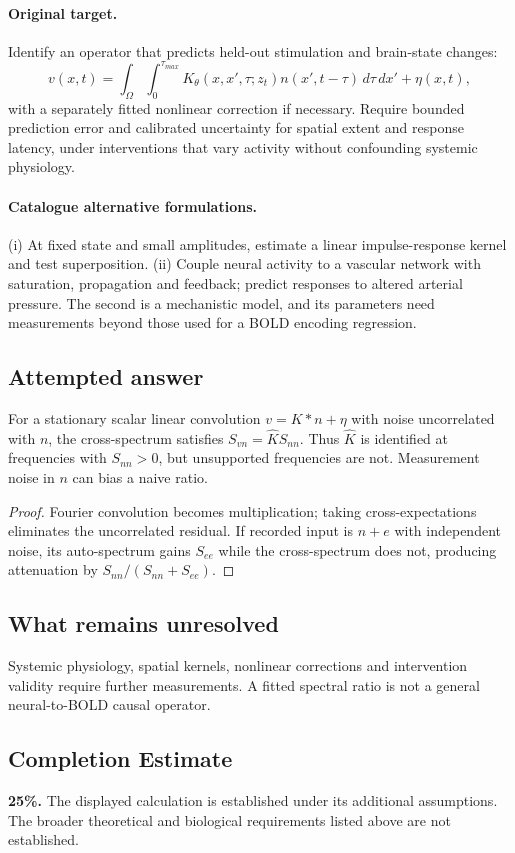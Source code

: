 \documentclass[11pt]{article}
\begin{document}
\paragraph{Original target.}
Identify an operator that predicts held-out stimulation and brain-state changes:
\[
 v(x,t)=\int_\Omega\int_0^{\tau_{max}}K_\theta(x,x',\tau;z_t)n(x',t-\tau)\,d\tau\,dx'+\eta(x,t),
\]
with a separately fitted nonlinear correction if necessary. Require bounded prediction error and calibrated uncertainty for spatial extent and response latency, under interventions that vary activity without confounding systemic physiology.
\paragraph{Catalogue alternative formulations.}
(i) At fixed state and small amplitudes, estimate a linear impulse-response kernel and test superposition. (ii) Couple neural activity to a vascular network with saturation, propagation and feedback; predict responses to altered arterial pressure. The second is a mechanistic model, and its parameters need measurements beyond those used for a BOLD encoding regression.
\subsection{Attempted answer}
\begin{proposition}
For a stationary scalar linear convolution $v=K*n+\eta$ with noise uncorrelated with $n$, the cross-spectrum satisfies $S_{vn}=\widehat K S_{nn}$. Thus $\widehat K$ is identified at frequencies with $S_{nn}>0$, but unsupported frequencies are not. Measurement noise in $n$ can bias a naive ratio.
\end{proposition}
\begin{proof}
Fourier convolution becomes multiplication; taking cross-expectations eliminates the uncorrelated residual. If recorded input is $n+e$ with independent noise, its auto-spectrum gains $S_{ee}$ while the cross-spectrum does not, producing attenuation by $S_{nn}/(S_{nn}+S_{ee})$.
\end{proof}
\subsection{What remains unresolved}
Systemic physiology, spatial kernels, nonlinear corrections and intervention validity require further measurements. A fitted spectral ratio is not a general neural-to-BOLD causal operator.
\subsection{Completion Estimate}
\textbf{25\%.} The displayed calculation is established under its additional assumptions. The broader theoretical and biological requirements listed above are not established.
\end{document}
